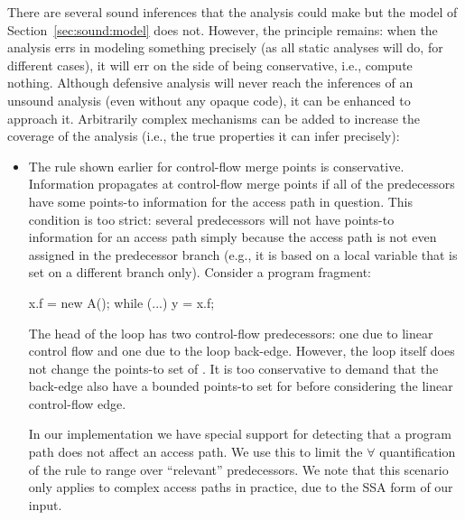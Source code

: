 There are several sound inferences that the analysis could make but the model of Section~\ref{sec:sound:model} does not. However, the principle remains: when the analysis errs in modeling something precisely (as all static analyses will do, for different cases), it will err on the side of being conservative, i.e., compute nothing. Although defensive analysis will never reach the inferences of an unsound analysis (even without any opaque code), it can be enhanced to approach it. Arbitrarily complex mechanisms can be added to increase the coverage of the analysis (i.e., the true properties it can infer precisely):

\begin{itemize}
\item
The rule shown earlier for control-flow merge points is conservative. Information propagates at control-flow merge points if all of the predecessors have some points-to information for the access path in question. This condition is too strict: several predecessors will not have points-to information for an access path simply because the access path is not even assigned in the predecessor branch (e.g., it is based on a local variable that is set on a different branch only). Consider a program fragment:

\begin{javaBox}
x.f = new A();
while (...) {
    y = x.f;
}
\end{javaBox}

The head of the loop has two control-flow predecessors: one due to linear control flow and one due to the loop back-edge. However, the loop itself does not change the points-to set of . It is too conservative to demand that the back-edge also have a bounded points-to set for  before considering the linear control-flow edge.

In our implementation we have special support for detecting that a program path does not affect an access path. We use this to limit the $\forall$ quantification of the rule to range over ``relevant'' predecessors. We note that this scenario only applies to complex access paths in practice, due to the SSA form of our input.



\end{itemize}
